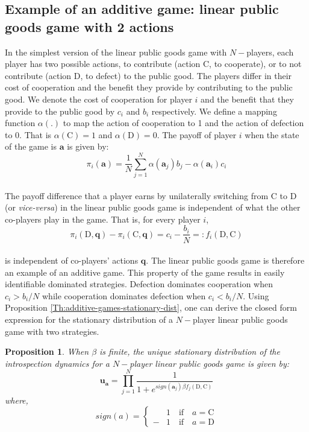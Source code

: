 \documentclass[11pt]{article}
\theoremstyle{plainCl1}
\newtheorem{Prop}{Proposition}
\theoremstyle{plainCl2}
\newcommand{\abf}{\mathbf{a}}
\newcommand{\qbf}{\mathbf{q}}
\newcommand{\ubf}{\mathbf{u}}
\newcommand{\C}{\mathrm{C}}
\newcommand{\D}{\mathrm{D}}
\begin{document}
\subsection*{Example of an additive game: linear public goods game with 2 actions}
In the simplest version of the linear public goods game with $N-$players, each player has two possible actions, to contribute (action $\C$, to cooperate), or to not contribute (action $\D$, to defect) to the public good. The players differ in their cost of cooperation and the benefit they provide by contributing to the public good. We denote the cost of cooperation for player $i$ and the benefit that they provide to the public good by $c_i$ and $b_i$ respectively. We define a mapping function $\alpha(.)$ to map the action of cooperation to 1 and the action of defection to 0. That is $\alpha(\C) = 1$ and $\alpha(\D) = 0$.  The payoff of player $i$ when the state of the game is $\abf$ is given by: \\
\begin{equation}
\pi_i(\abf) = \frac{1}{N}\sum_{j=1}^N \displaystyle \alpha(\abf_j) b_j - \alpha(\abf_i) c_i
\label{Eq:linear-pgg-payoff}
\end{equation}
\\
\noindent The payoff difference that a player earns by unilaterally switching from $\C$ to $\D$ (or \emph{vice-versa}) in the linear public goods game is independent of what the other co-players play in the game. That is, for every player $i$,
\begin{equation}
\pi_i(\D, \qbf) - \pi_i(\C, \qbf) = c_i - \frac{b_i}{N} =: f_i(\D, \C) 
\label{Eq:difference-payoffs-lpgg}
\end{equation}\\
\noindent is independent of co-players' actions $\qbf$. The linear public goods game is therefore an example of an additive game. This property of the game results in easily identifiable dominated strategies. Defection dominates cooperation when $c_i > b_i/N$ while cooperation dominates defection when $c_i < b_i/N$. Using Proposition \ref{Th:additive-games-stationary-dist}, one can derive the closed form expression for the stationary distribution of a $N-$player linear public goods game with two strategies. 
\begin{Prop}
\label{prop:stationary-dist-lpgg}
When $\beta$ is finite, the unique stationary distribution of the introspection dynamics for a $N-$player linear public goods game is given by: 
\\
\begin{equation}
\ubf_\abf = \prod_{j = 1}^{N} \frac{1}{1 + \displaystyle e^{\mathit{sign}(\abf_j)\beta f_j(\D, \C )}} 
\label{Eq:stationary_dist_lpgg}
\end{equation}
where, 
\begin{equation}
\label{Eq:sign-function}
\mathit{sign}(a) =
\begin{cases}
&1 \quad \text{if} \quad a = \C \\
-&1 \quad \text{if} \quad a = \D
\end{cases}
\end{equation} \\
\end{Prop}
\end{document}
